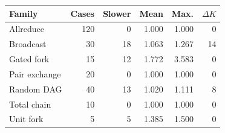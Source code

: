 \begin{tabular}{lrrrrr}\toprule
Family & Cases & Slower & Mean & Max. & $\Delta K$\\\midrule
Allreduce & 120 & 0 & 1.000 & 1.000 & 0 \\
Broadcast & 30 & 18 & 1.063 & 1.267 & 14 \\
Gated fork & 15 & 12 & 1.772 & 3.583 & 0 \\
Pair exchange & 20 & 0 & 1.000 & 1.000 & 0 \\
Random DAG & 40 & 13 & 1.020 & 1.111 & 8 \\
Total chain & 10 & 0 & 1.000 & 1.000 & 0 \\
Unit fork & 5 & 5 & 1.385 & 1.500 & 0 \\
\bottomrule\end{tabular}
